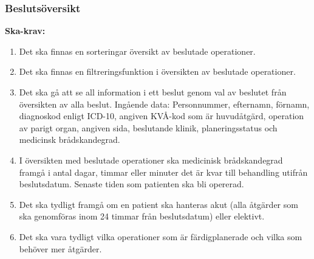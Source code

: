 \documentclass{article}
\begin{document}
\subsubsection{Beslutsöversikt}
\textbf{Ska-krav: }
\begin{enumerate}
  \item Det ska finnas en sorteringar översikt av beslutade operationer.
  \item Det ska finnas en filtreringsfunktion i översikten av beslutade
  operationer.
  \item Det ska gå att se all information i ett beslut genom val av
  beslutet från översikten av alla beslut.
  Ingående data:
  Personnummer, efternamn, förnamn, diagnoskod enligt ICD-10, angiven KVÅ-kod
  som är huvudåtgärd, operation av parigt organ, angiven sida, beslutande
  klinik, planeringsstatus och medicinsk brådskandegrad.
  \item I översikten med beslutade operationer ska medicinisk brådskandegrad
  framgå i antal dagar, timmar eller minuter det är kvar till behandling utifrån
  beslutsdatum. Senaste tiden som patienten ska bli opererad.
  \item Det ska tydligt framgå om en patient ska hanteras akut (alla åtgärder
  som ska genomföras inom 24 timmar från beslutsdatum) eller elektivt.
  \item Det ska vara tydligt vilka operationer som är färdigplanerade och vilka
  som behöver mer åtgärder.
\end{enumerate}
\end{document}
